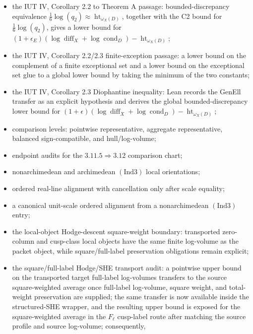 \documentclass[11pt]{article}
\begin{document}
\begin{itemize}
  \(\log\operatorname{diff}_X(x_E)=\log(d_{F_{\mathrm{tpd}}})\) and
  \(\log(f_{F_{\mathrm{tpd}}})\le\log\operatorname{cond}_D(x_E)\le
   \log(f_{F_{\mathrm{tpd}}})+\log(2\ell)\);
\item the IUT IV, Corollary 2.2 to Theorem A passage:
  bounded-discrepancy equivalence
  \(\frac16\log(q_2)\approx\operatorname{ht}_{\omega_X(D)}\), together with the
  C2 bound for \(\frac16\log(q_2)\), gives a lower bound for
  \((1+\epsilon_E)(\log\operatorname{diff}_X+\log\operatorname{cond}_D)
   -\operatorname{ht}_{\omega_X(D)}\);
\item the IUT IV, Corollary 2.2/2.3 finite-exception passage:
  a lower bound on the complement of a finite exceptional set and a lower bound
  on the exceptional set glue to a global lower bound by taking the minimum of
  the two constants;
\item the IUT IV, Corollary 2.3 Diophantine inequality:
  Lean records the GenEll transfer as an explicit hypothesis and derives the
  global bounded-discrepancy lower bound for
  \((1+\epsilon)(\log\operatorname{diff}_X+\log\operatorname{cond}_D)
   -\operatorname{ht}_{\omega_X(D)}\);
\item comparison levels:
  pointwise representative, aggregate representative, balanced sign-compatible,
  and hull/log-volume;
\item endpoint audits for the \(3.11.5 \Rightarrow 3.12\) comparison chart;
\item nonarchimedean and archimedean \((\mathrm{Ind3})\) local orientations;
\item ordered real-line alignment with cancellation only after scale equality;
\item a canonical unit-scale ordered alignment from a nonarchimedean
  \((\mathrm{Ind3})\) entry;
\item the local-object Hodge-descent square-weight boundary:
  transported zero-column and cusp-class local objects have the same finite
  log-volume as the packet object, while square/full-label preservation
  obligations remain explicit;
\item the square/full-label Hodge/SHE transport audit:
  a pointwise upper bound on the transported target full-label log-volumes
  transfers to the source square-weighted average once full-label log-volume,
  square weight, and total-weight preservation are supplied; the same transfer
  is now available inside the structured-SHE wrapper, and the resulting upper
  bound is exposed for the square-weighted average in the \(F_\ell\) cusp-label
  route after matching the source profile and source log-volume; consequently,

\end{itemize}
\end{document}
